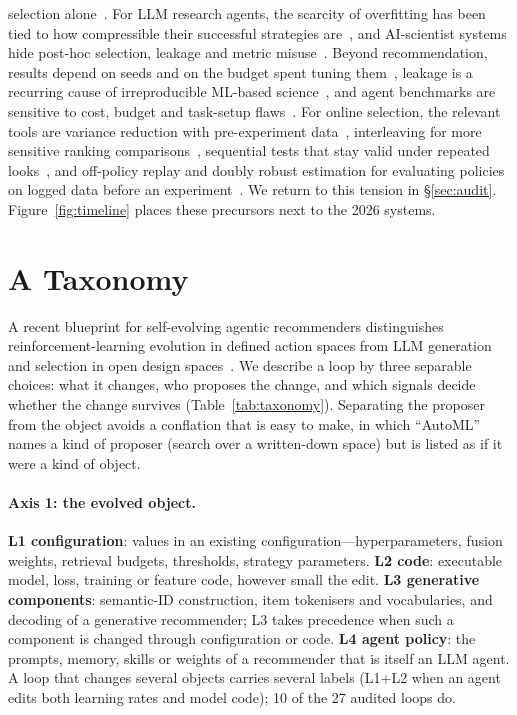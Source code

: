\documentclass[sigconf,nonacm]{acmart}
\begin{document}
selection alone~\cite{grover2026luckyruns}. For LLM research agents, the scarcity of overfitting has been tied to how
compressible their successful strategies are~\cite{bertran2026whatfits}, and AI-scientist systems hide post-hoc selection, leakage and metric
misuse~\cite{luo2025pitfalls}. Beyond recommendation, results depend on seeds and on the budget spent tuning
them~\cite{henderson2018deeprl,bouthillier2021variance,dodge2019showyourwork}, leakage is a recurring cause of
irreproducible ML-based science~\cite{kapoor2023leakage}, and agent benchmarks are sensitive to cost, budget and
task-setup flaws~\cite{kapoor2025agentsmatter,wijk2024rebench,huang2023mlagentbench,zhu2025abc}. For online
selection, the relevant tools are variance reduction with pre-experiment data~\cite{deng2013cuped}, interleaving for
more sensitive ranking comparisons~\cite{chapelle2012interleaving}, sequential tests that stay valid under repeated
looks~\cite{johari2015alwaysvalid}, and off-policy replay and doubly robust estimation for evaluating policies on
logged data before an experiment~\cite{li2011replay,dudik2011doublyrobust}.
We return to this tension in \S\ref{sec:audit}. Figure~\ref{fig:timeline} places these precursors next to the
2026 systems.



\section{A Taxonomy}\label{sec:taxonomy}

A recent blueprint for self-evolving agentic recommenders distinguishes reinforcement-learning evolution in defined
action spaces from LLM generation and selection in open design spaces~\cite{hu2026rethinking}. We describe a loop by
three separable choices: what it changes, who proposes the change, and which signals decide
whether the change survives (Table~\ref{tab:taxonomy}). Separating the proposer from the object avoids a conflation
that is easy to make, in which ``AutoML'' names a kind of proposer (search over a written-down space) but is listed as if
it were a kind of object.

\paragraph{Axis 1: the evolved object.}
\textbf{L1 configuration}: values in an existing configuration---hyperparameters, fusion weights, retrieval budgets,
thresholds, strategy parameters.
\textbf{L2 code}: executable model, loss, training or feature code, however small the edit.
\textbf{L3 generative components}: semantic-ID construction, item tokenisers and vocabularies, and decoding of a
generative recommender; L3 takes precedence when such a component is changed through configuration or code.
\textbf{L4 agent policy}: the prompts, memory, skills or weights of a recommender that is itself an LLM agent.
A loop that changes several objects carries several labels (L1+L2 when an agent edits both learning rates and
model code); 10 of the 27 audited loops do.
\end{document}
